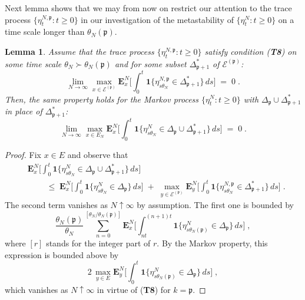 \documentclass[reqno]{amsart}
\newtheorem{lemma}[theorem]{Lemma}
\begin{document}
Next lemma shows that we may from now on restrict our attention to the
trace process $\{\eta^{N,{{\mathfrak p}}}_t : t\ge 0\}$ in our investigation of the
metastability of $\{\eta^{N}_t : t\ge 0\}$ on a time scale longer than
$\theta_N({{\mathfrak p}})$.

\begin{lemma}
\label{s16}
Assume that the trace process $\{\eta^{N,{{\mathfrak p}}}_t : t\ge 0\}$ satisfy
condition ({\bf T8}) on some time scale $\theta_N \succ \theta_N ({{\mathfrak p}})$ and for some subset $\Delta^*_{{{\mathfrak p}} +1}$ of ${{\mathcal E}}^{({{\mathfrak p}})}$:
\begin{equation*}
\lim_{N\to \infty} \max_{x\in {{\mathcal E}}^{({{\mathfrak p}})}} {{\mathbf E}}^N_x \Big[ \int_0^t 
{{\mathbf 1}}\{ \eta^{N,{{\mathfrak p}}}_{s \theta_N} \in \Delta^*_{{{\mathfrak p}} +1} \} \, ds
\Big]\;=\; 0\;.
\end{equation*}
Then, the same property holds for the Markov process $\{\eta^N_t :
t\ge 0\}$ with $\Delta_{{{\mathfrak p}}} \cup \Delta^*_{{{\mathfrak p}} +1}$ in place of
$\Delta^*_{{{\mathfrak p}} +1}$:
\begin{equation*}
\lim_{N\to \infty} \max_{x\in E_N} {{\mathbf E}}^N_x \Big[ \int_0^t 
{{\mathbf 1}}\{ \eta^{N}_{s \theta_N} \in \Delta_{{{\mathfrak p}}} \cup 
\Delta^*_{{{\mathfrak p}} +1} \} \, ds \Big]\;=\; 0\;.
\end{equation*}
\end{lemma}

\begin{proof}
Fix $x \in E$ and observe that
\begin{equation*}
\begin{split}
& {{\mathbf E}}^N_x \Big[ \int_0^t {{\mathbf 1}}\{ \eta^{N}_{s \theta_N} 
\in \Delta_{{{\mathfrak p}}} \cup \Delta^*_{{{\mathfrak p}} +1} \} \, ds \Big] \\ 
&\qquad \;\le\; {{\mathbf E}}^N_x \Big[ \int_0^t {{\mathbf 1}}\{ \eta^{N}_{s \theta_N} 
\in \Delta_{{{\mathfrak p}}}\} \, ds \Big] \;+\; \max_{y\in {{\mathcal E}}^{({{\mathfrak p}})}}
{{\mathbf E}}^N_y \Big[ \int_0^t {{\mathbf 1}}\{ \eta^{N, {{\mathfrak p}}}_{s \theta_N} 
\in \Delta^*_{{{\mathfrak p}} +1} \} \, ds \Big]\;.    
\end{split}
\end{equation*}
The second term vanishes as $N\uparrow\infty$ by assumption.
The first one is bounded by
\begin{equation*}
\frac {\theta_N({{\mathfrak p}})}{\theta_N} \sum_{n=0}^{[\theta_N/\theta_N({{\mathfrak p}})]} 
{{\mathbf E}}^N_x \Big[ \int_{nt}^{(n+1)t} {{\mathbf 1}}\{ \eta^{N}_{s \theta_N({{\mathfrak p}})} 
\in \Delta_{{{\mathfrak p}}}\} \, ds \Big]\;,
\end{equation*}
where $[r]$ stands for the integer part of $r$. By the Markov
property, this expression is bounded above by
\begin{equation*}
2\, \max_{y\in E} 
{{\mathbf E}}^N_y \Big[ \int_{0}^{t} {{\mathbf 1}}\{ \eta^{N}_{s \theta_N({{\mathfrak p}})} 
\in \Delta_{{{\mathfrak p}}}\} \, ds \Big]\; ,
\end{equation*}
which vanishes as $N\uparrow\infty$ in virtue of ({\bf T8}) for $k={{\mathfrak p}}$.
\end{proof}
\end{document}
